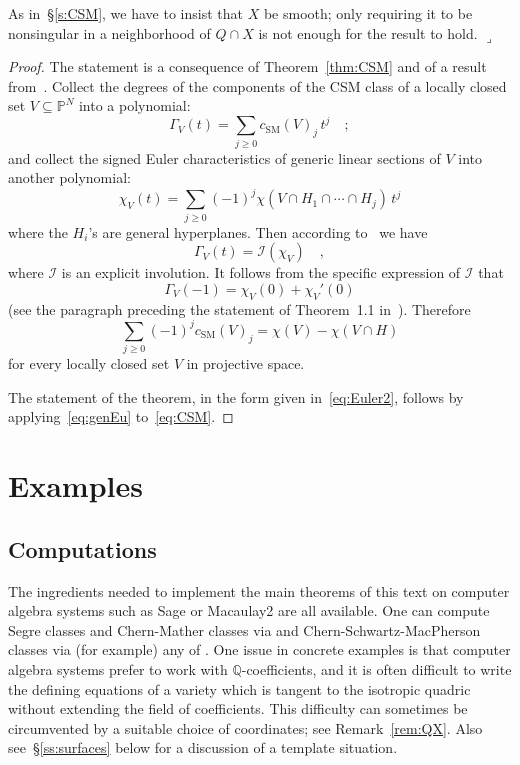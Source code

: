 \documentclass[11pt]{amsart}
\numberwithin{equation}{section}
\newcommand{\Pbb}{{\mathbb{P}}}
\newcommand{\Qbb}{{\mathbb{Q}}}
\newcommand{\cI}{{\mathscr I}}
\newcommand{\csm}{{c_{\text{SM}}}}
\newcommand{\qede}{\hfill$\lrcorner$}
\begin{document}
\begin{remark}
As in~\S\ref{s:CSM}, we have to insist that $X$ be smooth; only requiring it to be
nonsingular in a neighborhood of $Q\cap X$ is not enough for the result to hold.
\qede\end{remark}

\begin{proof}
The statement is a consequence of Theorem~\ref{thm:CSM} and of a result
from~\cite{MR3031565}. Collect the degrees of the components of the CSM class of
a locally closed set $V\subseteq\Pbb^N$ into a polynomial: 
\[
\Gamma_V(t)= \sum_{j\ge 0} \csm(V)_j\, t^j\quad;
\]
and collect the signed Euler characteristics of generic linear sections of $V$ into another
polynomial:
\[
\chi_V(t)= \sum_{j\ge 0} (-1)^j \chi(V\cap H_1\cap \cdots \cap H_j)\, t^j
\]
where the $H_i$'s are general hyperplanes. Then according 
to~\cite[Theorem~1.1]{MR3031565} we have
\[
\Gamma_V(t) = \cI(\chi_V)\quad,
\]
where $\cI$ is an explicit involution. It follows from the specific expression of $\cI$ that
\[
\Gamma_V(-1) =\chi_V(0)+\chi_V'(0)
\]
(see the paragraph preceding the statement of Theorem~1.1 in~\cite{MR3031565}).
Therefore
\begin{equation}\label{eq:genEu}
\sum_{j\ge 0} (-1)^j \csm(V)_j = \chi(V)-\chi(V\cap H)
\end{equation}
for every locally closed set $V$ in projective space. 

The statement of the theorem, in the form given in~\eqref{eq:Euler2}, follows by
applying~\eqref{eq:genEu} to~\eqref{eq:CSM}.
\end{proof}


\section{Examples}\label{s:Ex}

\subsection{Computations}
The ingredients needed to implement the main theorems of this text on computer algebra
systems such as \textrm{Sage} \cite{sagemath} or \textrm{Macaulay2} \cite{M2} are 
all available. One can compute Segre classes and Chern-Mather classes via 
\cite{Harris201726} and Chern-Schwartz-MacPherson classes via (for example) any 
of \cite{MR1956868,MR3044490,Jost2013,MR3484270, MR3385954,Harris201726}.
One issue in concrete examples is that computer algebra systems prefer
to work with $\Qbb$-coefficients, and it is often difficult to write the defining equations 
of a variety which is tangent to the isotropic quadric without extending the field of 
coefficients. This difficulty can sometimes be circumvented by a suitable choice of
coordinates; see Remark~\ref{rem:QX}. Also see~\S\ref{ss:surfaces} below for a discussion
of a template situation. 
\end{document}
